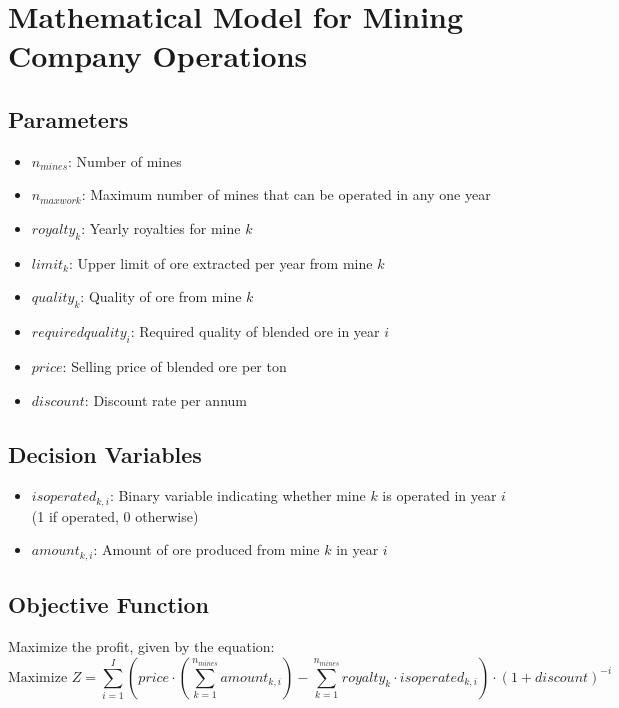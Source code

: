 \documentclass{article}
\begin{document}
\section*{Mathematical Model for Mining Company Operations}

\subsection*{Parameters}
\begin{itemize}
    \item $n_{mines}$: Number of mines
    \item $n_{maxwork}$: Maximum number of mines that can be operated in any one year
    \item $royalty_k$: Yearly royalties for mine $k$
    \item $limit_k$: Upper limit of ore extracted per year from mine $k$
    \item $quality_k$: Quality of ore from mine $k$
    \item $requiredquality_i$: Required quality of blended ore in year $i$
    \item $price$: Selling price of blended ore per ton
    \item $discount$: Discount rate per annum
\end{itemize}

\subsection*{Decision Variables}
\begin{itemize}
    \item $isoperated_{k, i}$: Binary variable indicating whether mine $k$ is operated in year $i$ (1 if operated, 0 otherwise)
    \item $amount_{k, i}$: Amount of ore produced from mine $k$ in year $i$
\end{itemize}

\subsection*{Objective Function}
Maximize the profit, given by the equation:
\[
\text{Maximize } Z = \sum_{i=1}^I \left( price \cdot \left( \sum_{k=1}^{n_{mines}} amount_{k, i} \right) - \sum_{k=1}^{n_{mines}} royalty_k \cdot isoperated_{k, i} \right) \cdot (1 + discount)^{-i}
\]
\end{document}
